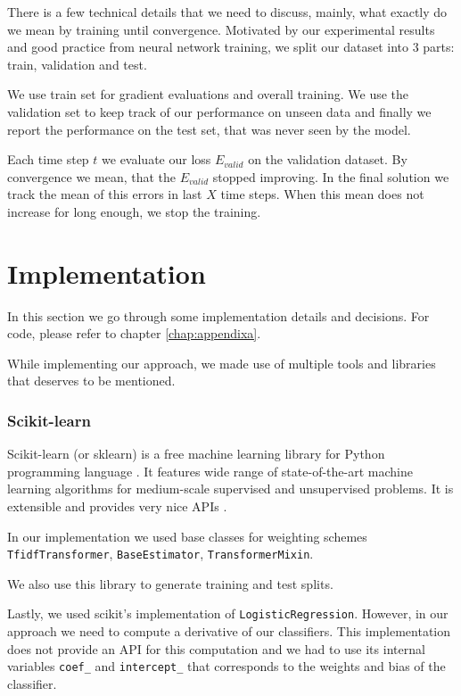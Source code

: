     There is a few technical details that we need to discuss, 
    mainly, what exactly do we mean by training until convergence.
    Motivated by our experimental results and good practice from neural network training,
    we split our dataset into $3$ parts: train, validation and test.
    
    We use train set for gradient evaluations and overall training. 
    We use the validation set to keep track of our performance on unseen data and finally we report the performance on the test set, that was never seen by the model.
    
    Each time step $t$ we evaluate our loss $E_{valid}$ on the validation dataset.
    By convergence we mean, that the $E_{valid}$ stopped improving.
    In the final solution we track the mean of this errors in last $X$ \* %
    time steps.
    When this mean does not increase for long enough, we stop the training.
    
    \section{Implementation}
        
        In this section we go through some implementation details and decisions.
        For code, please refer to chapter \ref{chap:appendixa}. \*%

        While implementing our approach, we made use of multiple tools and libraries that deserves to be mentioned.

        \subsubsection{Scikit-learn}
        
        Scikit-learn (or sklearn) is a free machine learning library for Python programming language \cite{scikit-learn}.
        It features wide range of state-of-the-art machine learning algorithms for medium-scale supervised and unsupervised problems.
        It is extensible and provides very nice APIs \cite{sklearn_api}.
        
        In our implementation we used base classes for weighting schemes \texttt{TfidfTransformer}, \texttt{BaseEstimator}, \texttt{TransformerMixin}.
        
        We also use this library to generate training and test splits. 
        
        Lastly, we used scikit's implementation of \texttt{LogisticRegression}.
        However, in our approach we need to compute a derivative of our classifiers. 
        This implementation does not provide an API for this computation and we had to use
        its internal variables \texttt{coef\_} and \texttt{intercept\_} that corresponds to the weights and bias of the classifier.
        
